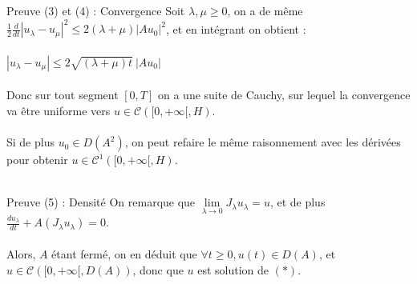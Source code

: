 \documentclass[10pt]{beamer}
\begin{document}
\begin{frame}{Preuve (3) et (4) : Convergence}
Soit $\lambda, \mu \geq 0$, on a de même  $\frac{1}{2}\frac{d}{dt}|u_\lambda-u_\mu|^2 \leq 2(\lambda + \mu) |Au_0|^2$, et en intégrant on obtient : \\~ \\
$|u_\lambda -u_\mu| \leq 2 \sqrt{(\lambda + \mu)t}\ |Au_0|$\\~ \\ 

Donc sur tout segment $[0,T]$ on a une suite de Cauchy, sur lequel la convergence va être uniforme vers $u \in \mathcal{C}([0,+\infty[,H)$. \\~\\ 

Si de plus $u_0 \in D(A^2)$, on peut refaire le même raisonnement avec les dérivées pour obtenir $u \in \mathcal{C}^1([0,+\infty[,H)$. \\~\\ 
\end{frame}


\begin{frame}{Preuve (5) : Densité}
On remarque que $\lim\limits_{\lambda\to 0} J_\lambda u_\lambda= u$, et de plus $\displaystyle \frac{du_\lambda}{dt} + A(J_\lambda u_\lambda)=0$. \\~ \\
Alors, $A$ étant fermé, on en déduit que $\forall t \geq 0, u(t) \in D(A)$, et $u \in \mathcal{C}([0,+\infty[,D(A))$, donc que $u$ est solution de $(*)$.\\~ \\
\end{frame}
\end{document}
